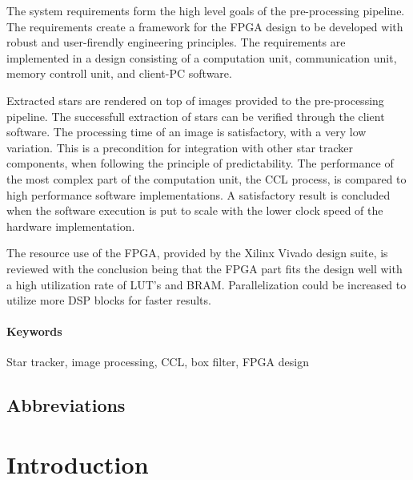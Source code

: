 \documentclass[12pt]{report}
\begin{document}
The system requirements form the high level goals of the pre-processing pipeline. The requirements create a framework for the FPGA design to be developed with robust and user-firendly engineering principles.
The requirements are implemented in a design consisting of a computation unit, communication unit, memory controll unit, and client-PC software.

Extracted stars are rendered on top of images provided to the pre-processing pipeline. The successfull extraction of stars can be verified through the client software. The processing time of an image is satisfactory, with a very low variation.
This is a precondition for integration with other star tracker components, when following the principle of predictability. The performance of the most complex part of the computation unit, the CCL process, is compared to high performance
software implementations. A satisfactory result is concluded when the software execution is put to scale with the lower clock speed of the hardware implementation.

The resource use of the FPGA, provided by the Xilinx Vivado design suite, is reviewed with the conclusion being that the FPGA part fits the design well with a high utilization rate of LUT's and BRAM. Parallelization could be increased to utilize more DSP blocks for faster results.

\subsubsection*{Keywords}
Star tracker, image processing, CCL, box filter, FPGA design

\section*{Abbreviations}

\tableofcontents
\listoffigures
\listoftables

\chapter{Introduction}
\end{document}

